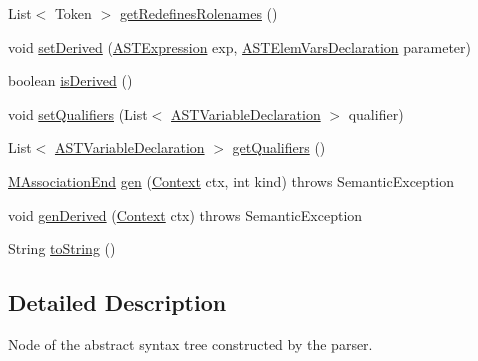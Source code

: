 \begin{DoxyCompactItemize}
List$<$ Token $>$ \hyperlink{classorg_1_1tzi_1_1use_1_1parser_1_1use_1_1_a_s_t_association_end_a8be6b7bce203cbf90e1d8bff3744292b}{get\-Redefines\-Rolenames} ()
\item 
void \hyperlink{classorg_1_1tzi_1_1use_1_1parser_1_1use_1_1_a_s_t_association_end_aedf1dcc46640ceb59856770cd28820f6}{set\-Derived} (\hyperlink{classorg_1_1tzi_1_1use_1_1parser_1_1ocl_1_1_a_s_t_expression}{A\-S\-T\-Expression} exp, \hyperlink{classorg_1_1tzi_1_1use_1_1parser_1_1ocl_1_1_a_s_t_elem_vars_declaration}{A\-S\-T\-Elem\-Vars\-Declaration} parameter)
\item 
boolean \hyperlink{classorg_1_1tzi_1_1use_1_1parser_1_1use_1_1_a_s_t_association_end_ae53bc211c38a79d2202ab83e1f6fc2b1}{is\-Derived} ()
\item 
void \hyperlink{classorg_1_1tzi_1_1use_1_1parser_1_1use_1_1_a_s_t_association_end_ad4036ee9933a8b18939673fb988ee6ef}{set\-Qualifiers} (List$<$ \hyperlink{classorg_1_1tzi_1_1use_1_1parser_1_1ocl_1_1_a_s_t_variable_declaration}{A\-S\-T\-Variable\-Declaration} $>$ qualifier)
\item 
List$<$ \hyperlink{classorg_1_1tzi_1_1use_1_1parser_1_1ocl_1_1_a_s_t_variable_declaration}{A\-S\-T\-Variable\-Declaration} $>$ \hyperlink{classorg_1_1tzi_1_1use_1_1parser_1_1use_1_1_a_s_t_association_end_ab49d117e1fcd524ac7366447985d1704}{get\-Qualifiers} ()
\item 
\hyperlink{classorg_1_1tzi_1_1use_1_1uml_1_1mm_1_1_m_association_end}{M\-Association\-End} \hyperlink{classorg_1_1tzi_1_1use_1_1parser_1_1use_1_1_a_s_t_association_end_a4f08865fdf1c2e92c756eb651a945601}{gen} (\hyperlink{classorg_1_1tzi_1_1use_1_1parser_1_1_context}{Context} ctx, int kind)  throws Semantic\-Exception 
\item 
void \hyperlink{classorg_1_1tzi_1_1use_1_1parser_1_1use_1_1_a_s_t_association_end_a18eb11f5ba1fc43b32f5c76a4583a87a}{gen\-Derived} (\hyperlink{classorg_1_1tzi_1_1use_1_1parser_1_1_context}{Context} ctx)  throws Semantic\-Exception 
\item 
String \hyperlink{classorg_1_1tzi_1_1use_1_1parser_1_1use_1_1_a_s_t_association_end_a4caea9b15691c2f175948d7b88a6b227}{to\-String} ()
\end{DoxyCompactItemize}


\subsection{Detailed Description}
Node of the abstract syntax tree constructed by the parser.

